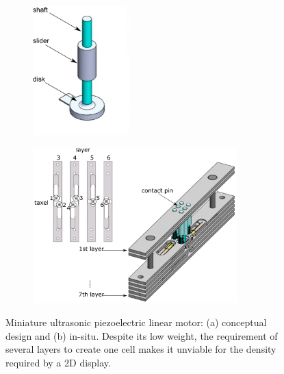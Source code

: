 \begin{figure}[ht] \centering
    \begin{subfigure}[b]{0.45\textwidth}\centering
        \includegraphics[height=5cm]{figures/piezo-miniature-a.png}
        \caption{}
        \label{fig:piezo-miniature-a}
    \end{subfigure}
    \begin{subfigure}[b]{0.50\textwidth}\centering
        \includegraphics[height=6cm]{figures/piezo-full-design-a.png}
        \caption{}
        \label{fig:piezo-miniature-b}
    \end{subfigure}
\caption[Miniature piezoelectric linear motor]{Miniature ultrasonic piezoelectric linear motor: (a) conceptual design and (b) in-situ. Despite its low weight, the requirement of several layers to create one cell makes it unviable for the density required by a 2D display.}
\label{fig:piezo-miniature}
\end{figure}